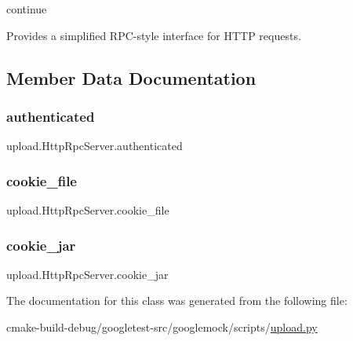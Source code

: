 continue \begin{DoxyVerb}Provides a simplified RPC-style interface for HTTP requests.\end{DoxyVerb}
 

\subsection{Member Data Documentation}
\mbox{\label{classupload_1_1HttpRpcServer_aaa356e2491537dd0d4bfc5b1bb0fec96}} 
\subsubsection{\texorpdfstring{authenticated}{authenticated}}
{\footnotesize\ttfamily upload.\+Http\+Rpc\+Server.\+authenticated}

\mbox{\label{classupload_1_1HttpRpcServer_ad5c1a730c030f9d3b5f70c2e0d8b9a1d}} 
\subsubsection{\texorpdfstring{cookie\_file}{cookie\_file}}
{\footnotesize\ttfamily upload.\+Http\+Rpc\+Server.\+cookie\+\_\+file}

\mbox{\label{classupload_1_1HttpRpcServer_a1b9c9af7f0a46afd84a9d524782323bf}} 
\subsubsection{\texorpdfstring{cookie\_jar}{cookie\_jar}}
{\footnotesize\ttfamily upload.\+Http\+Rpc\+Server.\+cookie\+\_\+jar}



The documentation for this class was generated from the following file\+:\begin{DoxyCompactItemize}
\item 
cmake-\/build-\/debug/googletest-\/src/googlemock/scripts/\mbox{\hyperlink{googlemock_2scripts_2upload_8py}{upload.\+py}}\end{DoxyCompactItemize}
